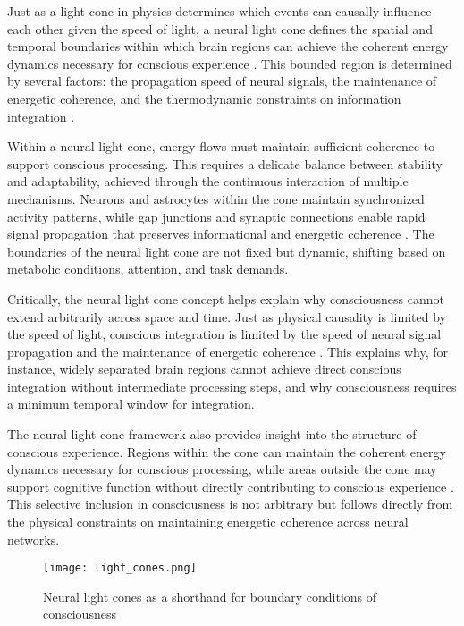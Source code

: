 \begin{refsection}
Just as a light cone in physics determines which events can causally influence each other given the speed of light, a neural light cone defines the spatial and temporal boundaries within which brain regions can achieve the coherent energy dynamics necessary for conscious experience \cite{northoff2017how}. This bounded region is determined by several factors: the propagation speed of neural signals, the maintenance of energetic coherence, and the thermodynamic constraints on information integration \cite{bekenstein1981universal}.

Within a neural light cone, energy flows must maintain sufficient coherence to support conscious processing. This requires a delicate balance between stability and adaptability, achieved through the continuous interaction of multiple mechanisms. Neurons and astrocytes within the cone maintain synchronized activity patterns, while gap junctions and synaptic connections enable rapid signal propagation that preserves informational and energetic coherence \cite{melloni2007synchronization}. The boundaries of the neural light cone are not fixed but dynamic, shifting based on metabolic conditions, attention, and task demands.

Critically, the neural light cone concept helps explain why consciousness cannot extend arbitrarily across space and time. Just as physical causality is limited by the speed of light, conscious integration is limited by the speed of neural signal propagation and the maintenance of energetic coherence \cite{delcul2007brain}. This explains why, for instance, widely separated brain regions cannot achieve direct conscious integration without intermediate processing steps, and why consciousness requires a minimum temporal window for integration.

The neural light cone framework also provides insight into the structure of conscious experience. Regions within the cone can maintain the coherent energy dynamics necessary for conscious processing, while areas outside the cone may support cognitive function without directly contributing to conscious experience \cite{zylberberg2010brain}. This selective inclusion in consciousness is not arbitrary but follows directly from the physical constraints on maintaining energetic coherence across neural networks.

\begin{figure}[h]
    \centering
    \texttt{[image: light\_cones.png]}

    \caption{Neural light cones as a shorthand for boundary conditions of consciousness}
\end{figure}


\end{refsection}
